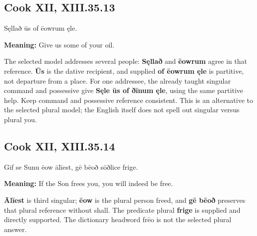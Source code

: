 \par\begin{minipage}{\linewidth}\raggedright
\subsection*{Cook XII, XIII.35.13}

Sęllað ūs of ēowrum ęle.

\textbf{Meaning:} Give us some of your oil.

The selected model addresses several people: \textbf{Sęllað} and \textbf{ēowrum} agree in that reference. \textbf{Ūs} is the dative recipient, and supplied \textbf{of ēowrum ęle} is partitive, not departure from a place. For one addressee, the already taught singular command and possessive give \textbf{Sęle ūs of ðīnum ęle}, using the same partitive help. Keep command and possessive reference consistent. This is an alternative to the selected plural model; the English itself does not spell out singular versus plural you.

\end{minipage}\par\addvspace{4pt}

\par\begin{minipage}{\linewidth}\raggedright
\subsection*{Cook XII, XIII.35.14}

Gif se Sunu ēow ālīest, gē bēoð sōðlice frige.

\textbf{Meaning:} If the Son frees you, you will indeed be free.

\textbf{Ālīest} is third singular; \textbf{ēow} is the plural person freed, and \textbf{gē bēoð} preserves that plural reference without shall. The predicate plural \textbf{frige} is supplied and directly supported. The dictionary headword frēo is not the selected plural answer.

\end{minipage}\par\addvspace{4pt}

